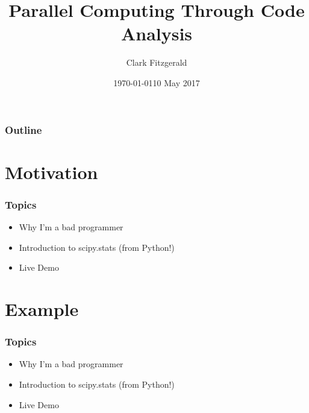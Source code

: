 \documentclass{beamer}
\begin{document}
\title{Parallel Computing Through Code Analysis}
\date{\today}
\date{10 May 2017}
\author{Clark Fitzgerald}

\frame{\titlepage}

\begin{frame}
    \frametitle{Outline}
    \tableofcontents
\end{frame}

\section{Motivation}
\begin{frame}


\frametitle{Topics}

\begin{itemize}

    \item Why I'm a bad programmer
    \item Introduction to scipy.stats (from Python!)
    \item Live Demo

\end{itemize}

\end{frame}
\section{Example}
\begin{frame}


\frametitle{Topics}

\begin{itemize}

    \item Why I'm a bad programmer
    \item Introduction to scipy.stats (from Python!)
    \item Live Demo

\end{itemize}

\end{frame}
\end{document}
